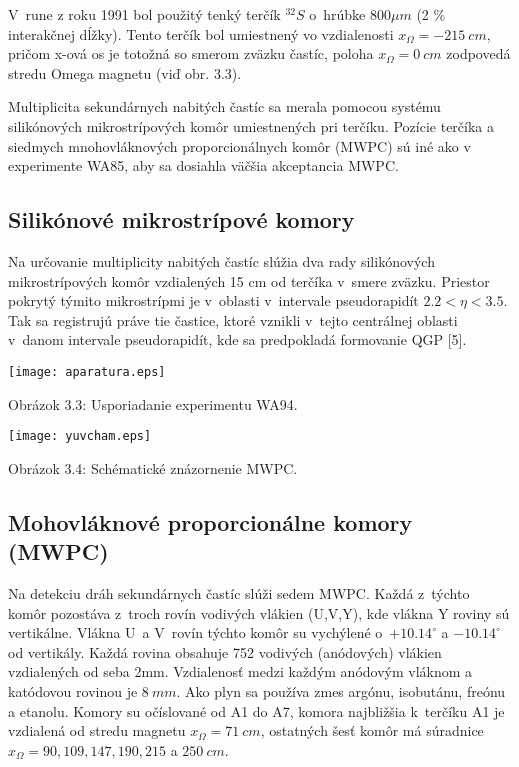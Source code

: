 V~rune z roku 1991 bol použitý tenký terčík $^{32}S$ o~hrúbke $800 \mu m$ (2
\% interakčnej dĺžky). Tento terčík bol umiestnený vo vzdialenosti
$x_{\Omega}=-215 \: cm$, pričom x-ová os je totožná so smerom zväzku
častíc, poloha $x_{\Omega}=0 \: cm$ zodpovedá stredu Omega magnetu (viď obr.
3.3).

Multiplicita sekundárnych nabitých častíc sa merala pomocou systému
silikónových mikrostrípových komôr umiestnených pri terčíku. 
Pozície terčíka a siedmych mnohovláknových proporcionálnych komôr (MWPC) sú
iné ako v experimente WA85, aby sa dosiahla väčšia  akceptancia
MWPC.

\subsection{Silikónové mikrostrípové komory}
Na určovanie multiplicity nabitých častíc slúžia dva rady silikónových
mikrostrípových  komôr vzdialených 15 cm od terčíka v~smere zväzku.
Priestor pokrytý týmito mikrostrípmi je v~oblasti v~intervale pseudorapidít 
$2.2 < \eta < 3.5$. 
Tak sa registrujú práve tie častice,
ktoré vznikli v~tejto centrálnej oblasti v~danom intervale pseudorapidít,
kde sa predpokladá formovanie QGP [5].

\newpage
\begin{center}
\texttt{[image: aparatura.eps]}
\end{center}
\begin{center}
  Obrázok 3.3: Usporiadanie experimentu WA94.
\end{center}

\newpage
 
\begin{center}
\texttt{[image: yuvcham.eps]}
\end{center}
\begin{center}
  Obrázok 3.4: Schématické znázornenie MWPC.
\end{center}

\subsection{Mohovláknové proporcionálne komory (MWPC)}
Na detekciu dráh sekundárnych častíc slúži sedem
MWPC. Každá z~týchto komôr pozostáva z~troch rovín vodivých vlákien (U,V,Y),
kde vlákna Y roviny sú vertikálne. Vlákna U~a V~rovín
týchto komôr su vychýlené o~$+10.14^{\circ}$ a $-10.14^{\circ}$ od vertikály.
Každá rovina obsahuje 752 vodivých (anódových) vlákien  vzdialených od seba
2mm. Vzdialenosť medzi každým anódovým vláknom a katódovou rovinou je $8\:
mm$. Ako plyn sa používa zmes argónu, isobutánu, freónu a etanolu. Komory su
očíslované od A1 do A7, komora najbližšia k~terčíku A1 je vzdialená od stredu
magnetu $x_{\Omega}=71\: cm$, ostatných šesť komôr má súradnice
$x_{\Omega}=90, 109, 147, 190, 215$ a $250\: cm$. 

